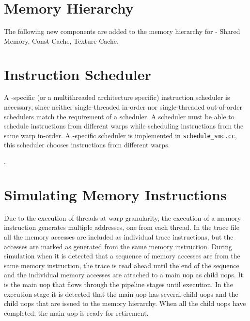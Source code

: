 \ignore
		{}

\section{Memory Hierarchy}

The following new components are added to the memory hierarchy for  - Shared Memory,
    Const Cache, Texture Cache.

\section{Instruction Scheduler}

A {\gpu}-specific (or a multithreaded architecture specific) instruction
scheduler is necessary, since neither single-threaded in-order nor
single-threaded out-of-order schedulers match the requirement of a {\gpu}
scheduler. A {\gpu} scheduler must be able to schedule instructions from
different warps while scheduling instructions from the same warp
in-order. A {\gpu}-specific scheduler is implemented in
\Verb+schedule_smc.cc+, this scheduler chooses instructions from
different warps. 

.

\section{Simulating Memory Instructions}

Due to the execution of threads at warp granularity, the execution of a memory
instruction generates multiple addresses, one from each thread. In the trace
file all the memory accesses are included as individual trace instructions, but
the accesses are marked as generated from the same memory instruction. During
simulation when it is detected that a sequence of memory accesses are from the
same memory instruction, the trace is read ahead until the end of the sequence
and the individual memory accesses are attached to a main uop as child uops. It
is the main uop that flows through the pipeline stages until execution. In the
execution stage it is detected that the main uop has several child uops and the
child uops that are issued to the memory hierarchy. When all the child uops
have completed, the main uop is ready for retirement.

